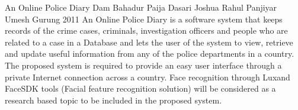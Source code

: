  \begin{conf-abstract}[]
{An Online Police Diary}
{ Dam Bahadur Paija
  Dasari Joshua
  Rahul Panjiyar
  Umesh Gurung 
}
{ 2011 }
      An Online Police Diary is a software system that keeps records of the crime cases, criminals, investigation officers and people who are related to a case in a Database and lets the user of the system to view, retrieve and update useful information from any of the police departments in a country. The proposed system is required to provide an easy user interface through a private Internet connection across a country. Face recognition through Luxand FaceSDK tools (Facial feature recognition solution) will be considered as a research based topic to be included in the proposed system. 
  \end{conf-abstract}